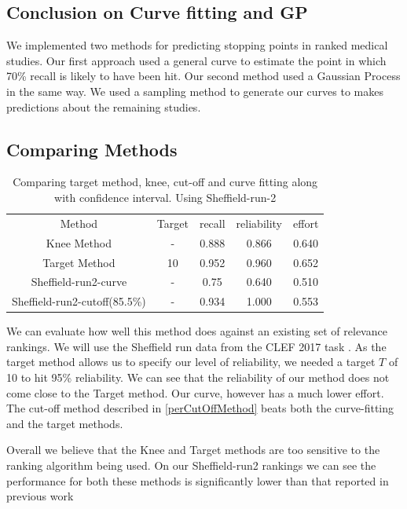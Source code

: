 \subsection{Conclusion on Curve fitting and GP} \label{conclusCurveAndGp}

We implemented two methods for predicting stopping points in ranked medical studies. Our first approach used a general curve to estimate the point in which 70\% recall is likely to have been hit. Our second method used a Gaussian Process in the same way. We used a sampling method to generate our curves to makes predictions about the remaining studies.

\subsection{Comparing Methods} \label{compMethods}

\begin{table}[H]

\centering
\begin{tabular}{|c|c|c|c|c|} 
 \hline
 Method & Target & recall & reliability & effort  \\ 
 Knee Method & - & 0.888 & 0.866 & 0.640 \\
 Target Method & 10 & 0.952 & 0.960 & 0.652 \\
 Sheffield-run2-curve & - & 0.75 & 0.640 & 0.510 \\
 Sheffield-run2-cutoff(85.5\%) & - & 0.934 & 1.000 & 0.553 \\
 \hline
\end{tabular}
\caption{Comparing target method, knee, cut-off and curve fitting along with confidence interval. Using Sheffield-run-2}

\end{table}

We can evaluate how well this method does against an existing set of relevance rankings. We will use the Sheffield run data from the CLEF 2017 task \cite{Kanoulas12017}. As the target method allows us to specify our level of reliability, we needed a target $T$ of 10 to hit 95\% reliability. We can see that the reliability of our method does not come close to the Target method. Our curve, however has a much lower effort. The cut-off method described in \ref{perCutOffMethod} beats both the curve-fitting and the target methods.

Overall we believe that the Knee and Target methods are too sensitive to the ranking algorithm being used. On our Sheffield-run2 rankings we can see the performance for both these methods is significantly lower than that reported in previous work \cite{Cormack2016}


